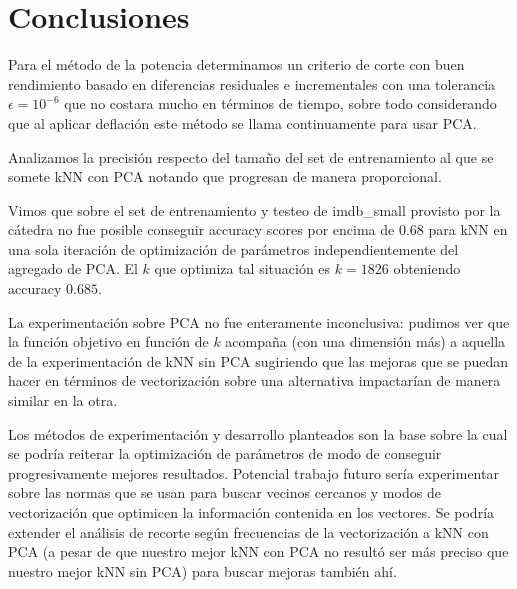 \section{Conclusiones}%

Para el método de la potencia determinamos un criterio de corte con buen rendimiento basado en diferencias residuales e incrementales con una tolerancia $\epsilon = 10^{-6}$ que no costara mucho en términos de tiempo, sobre todo considerando que al aplicar deflación este método se llama continuamente para usar PCA.

Analizamos la precisión respecto del tamaño del set de entrenamiento al que se somete kNN con PCA notando que progresan de manera proporcional.

Vimos que sobre el set de entrenamiento y testeo de imdb\_small provisto por la cátedra no fue posible conseguir accuracy scores por encima de $0.68$ para kNN en una sola iteración de optimización de parámetros independientemente del agregado de PCA. El $k$ que optimiza tal situación es $k=1826$ obteniendo accuracy $0.685$.

La experimentación sobre PCA no fue enteramente inconclusiva: pudimos ver que la función objetivo en función de $k$ acompaña (con una dimensión más) a aquella de la experimentación de kNN sin PCA sugiriendo que las mejoras que se puedan hacer en términos de vectorización sobre una alternativa impactarían de manera similar en la otra.

Los métodos de experimentación y desarrollo planteados son la base sobre la cual se podría reiterar la optimización de parámetros de modo de conseguir progresivamente mejores resultados.
Potencial trabajo futuro sería experimentar sobre las normas que se usan para buscar vecinos cercanos y modos de vectorización que optimicen la información contenida en los vectores. Se podría extender el análisis de recorte según frecuencias de la vectorización a kNN con PCA (a pesar de que nuestro mejor kNN con PCA no resultó ser más preciso que nuestro mejor kNN sin PCA) para buscar mejoras también ahí.

\label{sec:conclusiones}

